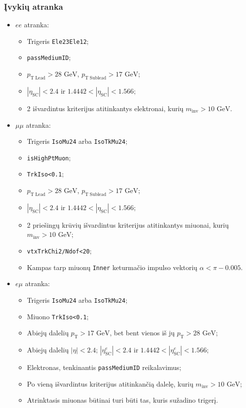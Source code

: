 \documentclass{beamer}
\newcommand{\pT}{\mathit{p}_{\mathrm{T}}}
\newcommand{\etaSC}{\eta_{\mathrm{SC}}}
\newcommand{\pTl}{\mathit{p}_{\mathrm{T\;Lead}}}
\newcommand{\pTsl}{\mathit{p}_{\mathrm{T\;Sublead}}}
\newcommand{\GeV}{$\mathrm{GeV}$}
\newcommand{\emu}{\mathit{e}\mu}
\newcommand{\ee}{\mathit{ee}}
\begin{document}
\begin{frame}[allowframebreaks]
\frametitle{Įvykių atranka}

\begin{itemize}
	\item $\ee$ atranka:
	\begin{itemize}
		\item Trigeris \texttt{Ele23Ele12};
		\item \texttt{passMediumID};
		\item $\pTl>28$ \GeV, $\pTsl>17$ \GeV;
		\item $|\etaSC|<2.4$ ir $1.4442<|\etaSC|<1.566$;
		\item 2 išvardintus kriterijus atitinkantys elektronai, kurių $\mathit{m}_{\mathrm{inv}}>10$ \GeV.
	\end{itemize}
	\item $\mu\mu$ atranka:
	\begin{itemize}
		\item Trigeris \texttt{IsoMu24} arba \texttt{IsoTkMu24};
		\item \texttt{isHighPtMuon};
		\item \texttt{TrkIso<0.1}; 
		\item $\pTl>28$ \GeV, $\pTsl>17$ \GeV;
		\item $|\etaSC|<2.4$ ir $1.4442<|\etaSC|<1.566$;
		\item 2 priešingų krūvių išvardintus kriterijus atitinkantys miuonai, kurių $\mathit{m}_{\mathrm{inv}}>10$ \GeV;
		\item \texttt{vtxTrkChi2/Ndof<20};
		\item Kampas tarp miuonų \texttt{Inner} keturmačio impulso vektorių $\alpha<\pi-0.005$.
	\end{itemize}
	\item $\emu$ atranka:
	\begin{itemize}
		\item Trigeris \texttt{IsoMu24} arba \texttt{IsoTkMu24};
		\item Miuono \texttt{TrkIso<0.1}; 
		\item Abiejų dalelių $\pT>17$ \GeV, bet bent vienos iš jų $\pT>28$ \GeV;
		\item Abiejų dalelių $|\eta|<2.4$; $|\etaSC^{\mathit{e}}|<2.4$ ir $1.4442<|\etaSC^{\mathit{e}}|<1.566$;
		\item Elektronas, tenkinantis \texttt{passMediumID} reikalavimus;
		\item Po vieną išvardintus kriterijus atitinkančią dalelę, kurių $\mathit{m}_{\mathrm{inv}}>10$ \GeV;
		\item Atrinktasis miuonas būtinai turi būti tas, kuris sužadino trigerį.
	\end{itemize}
\end{itemize}

\end{frame}
\end{document}
